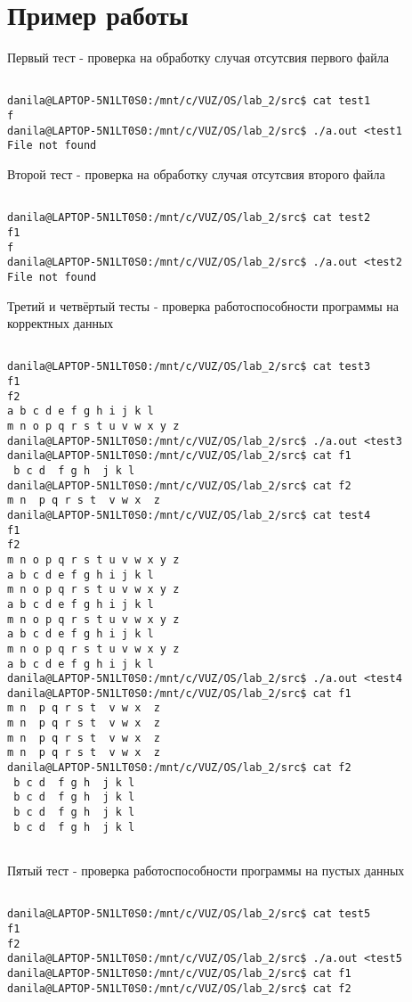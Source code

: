 \section{Пример работы}

Первый тест - проверка на обработку случая отсутсвия первого файла

\begin{verbatim}

danila@LAPTOP-5N1LT0S0:/mnt/c/VUZ/OS/lab_2/src$ cat test1
f
danila@LAPTOP-5N1LT0S0:/mnt/c/VUZ/OS/lab_2/src$ ./a.out <test1
File not found

\end{verbatim}

Второй тест - проверка на обработку случая отсутсвия второго файла

\begin{verbatim}

danila@LAPTOP-5N1LT0S0:/mnt/c/VUZ/OS/lab_2/src$ cat test2
f1
f
danila@LAPTOP-5N1LT0S0:/mnt/c/VUZ/OS/lab_2/src$ ./a.out <test2
File not found

\end{verbatim}

Третий и четвёртый тесты - проверка работоспособности программы на корректных данных

\begin{verbatim}

danila@LAPTOP-5N1LT0S0:/mnt/c/VUZ/OS/lab_2/src$ cat test3
f1
f2
a b c d e f g h i j k l
m n o p q r s t u v w x y z
danila@LAPTOP-5N1LT0S0:/mnt/c/VUZ/OS/lab_2/src$ ./a.out <test3
danila@LAPTOP-5N1LT0S0:/mnt/c/VUZ/OS/lab_2/src$ cat f1
 b c d  f g h  j k l 
danila@LAPTOP-5N1LT0S0:/mnt/c/VUZ/OS/lab_2/src$ cat f2
m n  p q r s t  v w x  z
danila@LAPTOP-5N1LT0S0:/mnt/c/VUZ/OS/lab_2/src$ cat test4
f1
f2
m n o p q r s t u v w x y z
a b c d e f g h i j k l
m n o p q r s t u v w x y z
a b c d e f g h i j k l
m n o p q r s t u v w x y z
a b c d e f g h i j k l
m n o p q r s t u v w x y z
a b c d e f g h i j k l
danila@LAPTOP-5N1LT0S0:/mnt/c/VUZ/OS/lab_2/src$ ./a.out <test4
danila@LAPTOP-5N1LT0S0:/mnt/c/VUZ/OS/lab_2/src$ cat f1
m n  p q r s t  v w x  z
m n  p q r s t  v w x  z
m n  p q r s t  v w x  z
m n  p q r s t  v w x  z
danila@LAPTOP-5N1LT0S0:/mnt/c/VUZ/OS/lab_2/src$ cat f2
 b c d  f g h  j k l 
 b c d  f g h  j k l 
 b c d  f g h  j k l
 b c d  f g h  j k l
 
\end{verbatim}

Пятый тест - проверка работоспособности программы на пустых данных

\begin{verbatim}
 
danila@LAPTOP-5N1LT0S0:/mnt/c/VUZ/OS/lab_2/src$ cat test5
f1
f2
danila@LAPTOP-5N1LT0S0:/mnt/c/VUZ/OS/lab_2/src$ ./a.out <test5
danila@LAPTOP-5N1LT0S0:/mnt/c/VUZ/OS/lab_2/src$ cat f1
danila@LAPTOP-5N1LT0S0:/mnt/c/VUZ/OS/lab_2/src$ cat f2

\end{verbatim}

\pagebreak


